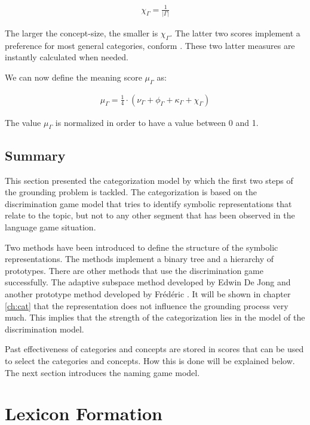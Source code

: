 \begin{eqnarray}
\displaystyle
\chi_{\Gamma}=\frac{1}{|\Gamma|}
\end{eqnarray}

\noindent
The larger the concept-size, the smaller is $\chi_{\Gamma}$. The latter two scores implement a preference for most general categories, conform \cite{steels:1996b}. These two latter measures are instantly calculated when needed.

We can now define the meaning score $\mu_\Gamma$ as:

\begin{eqnarray}
\displaystyle
\mu_{\Gamma}=\frac{1}{4}\cdot (\nu_{\Gamma}+\phi_{\Gamma}+\kappa_{\Gamma}+\chi_{\Gamma})
\end{eqnarray}

\noindent
The value $\mu_{\Gamma}$ is normalized in order to have a value between 0 and 1.

\subsection{Summary}

This section presented the categorization model by which the first two steps of the grounding problem is tackled. The categorization is based on the discrimination game model that tries to identify symbolic representations that relate to the topic, but not to any other segment that has been observed in the language game situation.

Two methods have been introduced to define the structure of the symbolic representations. The methods implement a binary tree and a hierarchy of prototypes. There are other methods that use the discrimination game successfully. The adaptive subspace method developed by Edwin De Jong \cite{dejongvogt:1998,dejong:2000} and another prototype method developed by Fr\'ed\'eric . It will be shown in chapter \ref{ch:cat} that the representation does not influence the grounding process very much. This implies that the strength of the categorization lies in the model of the discrimination model.

Past effectiveness of categories and concepts are stored in scores that can be used to select the categories and concepts. How this is done will be explained below. The next section introduces the naming game model.

\section{Lexicon Formation}\label{s:cm:ng}

